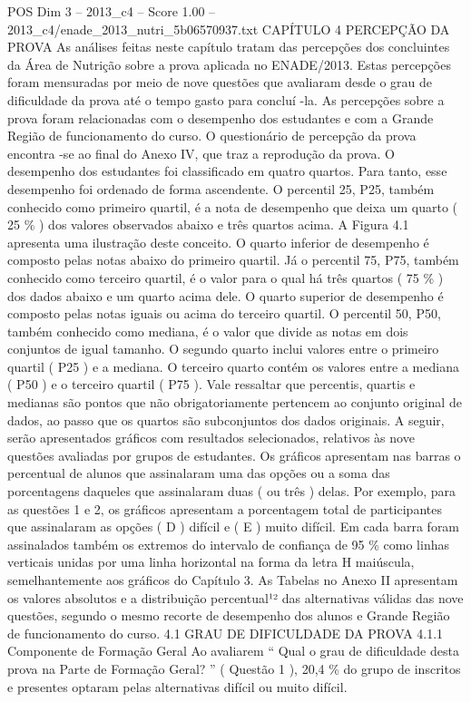 \begin{textsample}{POS Dim 3 – 2013\_c4 – Score 1.00 – 2013\_c4/enade\_2013\_nutri\_5b06570937.txt}  \label{ex:f3_pos_170}
CAPÍTULO 4 PERCEPÇÃO DA PROVA As análises feitas neste capítulo tratam das percepções dos concluintes da Área de Nutrição sobre a prova aplicada no ENADE/2013.
Estas percepções foram mensuradas por meio de nove questões que avaliaram desde o grau de dificuldade da prova até o tempo gasto para concluí -la.
As percepções sobre a prova foram relacionadas com o desempenho dos estudantes e com a Grande Região de funcionamento do curso.
O questionário de percepção da prova encontra -se ao final do Anexo IV, que traz a reprodução da prova.
O desempenho dos estudantes foi classificado em quatro quartos.
Para tanto, esse desempenho foi ordenado de forma ascendente.
O percentil 25, P25, também conhecido como primeiro quartil, é a nota de desempenho que deixa um quarto ( 25 \% ) dos valores observados abaixo e três quartos acima.
A Figura 4.1 apresenta uma ilustração deste conceito.
O quarto inferior de desempenho é composto pelas notas abaixo do primeiro quartil.
Já o percentil 75, P75, também conhecido como terceiro quartil, é o valor para o qual há três quartos ( 75 \% ) dos dados abaixo e um quarto acima dele.
O quarto superior de desempenho é composto pelas notas iguais ou acima do terceiro quartil.
O percentil 50, P50, também conhecido como mediana, é o valor que divide as notas em dois conjuntos de igual tamanho.
O segundo quarto inclui valores entre o primeiro quartil ( P25 ) e a mediana.
O terceiro quarto contém os valores entre a mediana ( P50 ) e o terceiro quartil ( P75 ).
Vale ressaltar que percentis, quartis e medianas são pontos que não obrigatoriamente pertencem ao conjunto original de dados, ao passo que os quartos são subconjuntos dos dados originais.
A seguir, serão apresentados gráficos com resultados selecionados, relativos às nove questões avaliadas por grupos de estudantes.
Os gráficos apresentam nas barras o percentual de alunos que assinalaram uma das opções ou a soma das porcentagens daqueles que assinalaram duas ( ou três ) delas.
Por exemplo, para as questões 1 e 2, os gráficos apresentam a porcentagem total de participantes que assinalaram as opções ( D ) difícil e ( E ) muito difícil.
Em cada barra foram assinalados também os extremos do intervalo de confiança de 95 \% como linhas verticais unidas por uma linha horizontal na forma da letra H maiúscula, semelhantemente aos gráficos do Capítulo 3.
As Tabelas no Anexo II apresentam os valores absolutos e a distribuição percentual¹² das alternativas válidas das nove questões, segundo o mesmo recorte de desempenho dos alunos e Grande Região de funcionamento do curso. 4.1 GRAU DE DIFICULDADE DA PROVA 4.1.1 Componente de Formação Geral Ao avaliarem “ Qual o grau de dificuldade desta prova na Parte de Formação Geral? ” ( Questão 1 ), 20,4 \% do grupo de inscritos e presentes optaram pelas alternativas difícil ou muito difícil.

\end{textsample}
